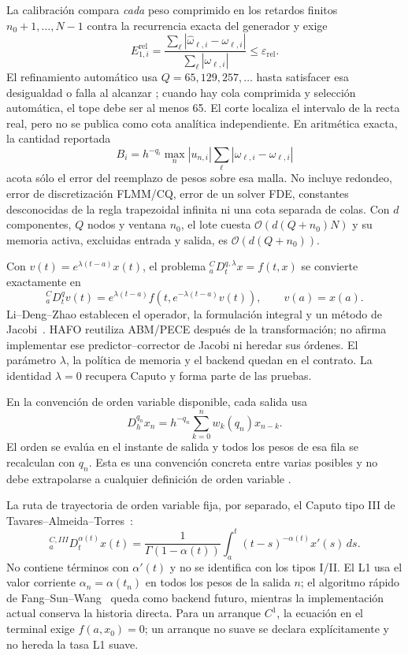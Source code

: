 La calibración compara \emph{cada} peso comprimido en los retardos finitos
\(n_0+1,\ldots,N-1\) contra la recurrencia exacta del generador y exige
\[
 E_{1,i}^{\mathrm{rel}}=
 \frac{\sum_\ell|\widehat\omega_{\ell,i}-\omega_{\ell,i}|}
      {\sum_\ell|\omega_{\ell,i}|}
 \le \varepsilon_{\mathrm{rel}}.
\]
El refinamiento automático usa \(Q=65,129,257,\ldots\) hasta satisfacer esa
desigualdad o falla al alcanzar ; cuando hay
cola comprimida y selección automática, el tope debe ser al menos 65. El corte
 localiza el intervalo de la recta real, pero no se
publica como cota analítica independiente. En aritmética exacta, la cantidad
reportada
\[
 B_i=h^{-q_i}\max_n|u_{n,i}|
 \sum_\ell|\widehat\omega_{\ell,i}-\omega_{\ell,i}|
\]
acota sólo el error del reemplazo de pesos sobre esa malla. No incluye
redondeo, error de discretización FLMM/CQ, error de un solver FDE, constantes
desconocidas de la regla trapezoidal infinita ni una cota separada de colas.
Con \(d\) componentes, \(Q\) nodos y ventana \(n_0\), el lote cuesta
\(\mathcal O\!\left(d(Q+n_0)N\right)\) y su memoria activa, excluidas entrada
y salida, es \(\mathcal O\!\left(d(Q+n_0)\right)\).

Con \(v(t)=e^{\lambda(t-a)}x(t)\), el problema
\({}_a^CD_t^{q,\lambda}x=f(t,x)\) se convierte exactamente en
\[
 {}_a^CD_t^qv(t)=e^{\lambda(t-a)}
 f\!\left(t,e^{-\lambda(t-a)}v(t)\right),\qquad v(a)=x(a).
\]
Li--Deng--Zhao establecen el operador, la formulación integral y un método de
Jacobi~\cite{LiDengZhao2019}. HAFO reutiliza ABM/PECE después de la
transformación; no afirma implementar ese predictor--corrector de Jacobi ni
heredar sus órdenes. El parámetro \(\lambda\), la política de memoria y el
backend quedan en el contrato. La identidad \(\lambda=0\) recupera Caputo y
forma parte de las pruebas.

En la convención de orden variable disponible, cada salida usa
\[
 D_h^{q_n}x_n=h^{-q_n}\sum_{k=0}^{n}w_k(q_n)x_{n-k}.
\]
El orden se evalúa en el instante de salida y todos los pesos de esa fila se
recalculan con \(q_n\). Esta es una convención concreta entre varias posibles y
no debe extrapolarse a cualquier definición de orden variable
\cite{SamkoRoss1993}.

La ruta de trayectoria de orden variable fija, por separado, el Caputo tipo III
de Tavares--Almeida--Torres~\cite{TavaresEtAl2016}:
\[
 {}_a^{C,III}D_t^{\alpha(t)}x(t)=
 \frac{1}{\Gamma(1-\alpha(t))}
 \int_a^t(t-s)^{-\alpha(t)}x'(s)\,ds.
\]
No contiene términos con \(\alpha'(t)\) y no se identifica con los tipos I/II.
El L1 usa el valor corriente \(\alpha_n=\alpha(t_n)\) en todos los pesos de la
salida \(n\); el algoritmo rápido de Fang--Sun--Wang~\cite{FangEtAl2020} queda
como backend futuro, mientras la implementación actual conserva la historia
directa. Para un arranque \(C^1\), la ecuación en el terminal exige
\(f(a,x_0)=0\); un arranque no suave se declara explícitamente y no hereda la
tasa L1 suave.

